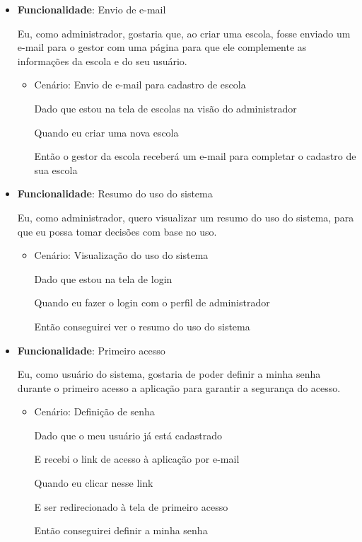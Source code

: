 \documentclass[
    12pt,               %
    openright,          %
    oneside,
    a4paper,            %
    english,            %
    brazil              %
    ]{ifsp-spo-inf-ctds} %
\begin{document}
\begin{itemize}
\item\textbf{Funcionalidade}: Envio de e-mail
    
    Eu, como administrador, gostaria que, ao criar uma escola, fosse enviado um e-mail para o gestor com uma página para que ele complemente as informações da escola e do seu usuário.
    \begin{itemize}
        \item Cenário: Envio de e-mail para cadastro de escola 
        \par Dado que estou na tela de escolas na visão do administrador
        \par Quando eu criar uma nova escola
        \par Então o gestor da escola receberá um e-mail para completar o cadastro de sua escola
    \end{itemize}    

\item\textbf{Funcionalidade}: Resumo do uso do sistema
    
    Eu, como administrador, quero visualizar um resumo do uso do sistema, para que eu possa tomar decisões com base no uso.
    \begin{itemize}
        \item Cenário: Visualização do uso do sistema 
        \par Dado que estou na tela de login
        \par Quando eu fazer o login com o perfil de administrador
        \par Então conseguirei ver o resumo do uso do sistema
    \end{itemize} 

\item\textbf{Funcionalidade}: Primeiro acesso
    
    Eu, como usuário do sistema, gostaria de poder definir a minha senha durante o primeiro acesso a aplicação para garantir a segurança do acesso.
    \begin{itemize}
        \item Cenário: Definição de senha  
        \par Dado que o meu usuário já está cadastrado
        \par E recebi o link de acesso à aplicação por e-mail
        \par Quando eu clicar nesse link
        \par E ser redirecionado à tela de primeiro acesso
        \par Então conseguirei definir a minha senha
    \end{itemize}


\end{itemize}
\end{document}
